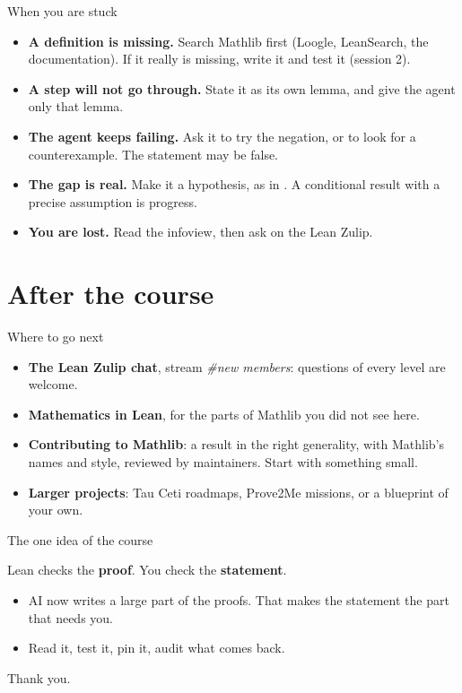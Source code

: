 \documentclass[10pt, aspectratio=169]{beamer}
\begin{document}
\begin{frame}[fragile]{When you are stuck}
\begin{itemize}
\item \textbf{A definition is missing.} Search Mathlib first (Loogle, LeanSearch, the documentation). If it really is missing, write it and test it (session 2).
\item \textbf{A step will not go through.} State it as its own lemma, and give the agent only that lemma.
\item \textbf{The agent keeps failing.} Ask it to try the negation, or to look for a counterexample. The statement may be false.
\item \textbf{The gap is real.} Make it a hypothesis, as in . A conditional result with a precise assumption is progress.
\item \textbf{You are lost.} Read the infoview, then ask on the Lean Zulip.
\end{itemize}
\end{frame}

\section{After the course}

\begin{frame}[fragile]{Where to go next}
\begin{itemize}
\item \textbf{The Lean Zulip chat}, stream \emph{\#new members}: questions of every level are welcome.
\item \textbf{Mathematics in Lean}, for the parts of Mathlib you did not see here.
\item \textbf{Contributing to Mathlib}: a result in the right generality, with Mathlib's names and style, reviewed by maintainers. Start with something small.
\item \textbf{Larger projects}: Tau Ceti roadmaps, Prove2Me missions, or a blueprint of your own.
\end{itemize}
\end{frame}

\begin{frame}[fragile]{The one idea of the course}
\begin{keypoint}
Lean checks the \textbf{proof}. You check the \textbf{statement}.
\end{keypoint}

\vspace{0.8em}
\begin{itemize}
\item AI now writes a large part of the proofs. That makes the statement the part that needs you.
\item Read it, test it, pin it, audit what comes back.
\end{itemize}

\vspace{1.5em}
\centering
{\Large Thank you.}
\end{frame}
\end{document}

